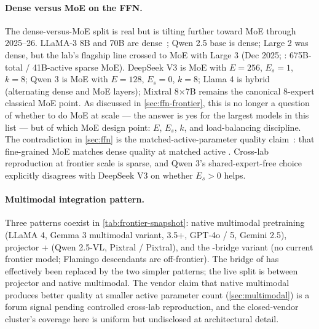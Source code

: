 \paragraph{Dense versus MoE on the FFN.}
The dense-versus-MoE split is real but is tilting further toward MoE
through 2025--26. LLaMA-3 8B and 70B are dense~\citep{meta-llama3};
Qwen 2.5 base is dense;  Large 2 was dense, but the lab's
flagship line crossed to MoE with  Large 3 (Dec 2025;
\citealp{mistral-large3-2025}: 675B-total / 41B-active sparse MoE).
DeepSeek V3 is MoE with $E = 256$, $E_s = 1$, $k = 8$; Qwen 3 is MoE
with $E = 128$, $E_s = 0$, $k = 8$; Llama 4 is hybrid (alternating
dense and MoE layers); Mixtral 8$\times$7B remains the canonical
8-expert classical MoE point. As discussed in
\cref{sec:ffn-frontier}, this is no longer a question of whether
to do MoE at scale --- the answer is yes for the largest models in
this list --- but of which MoE design point: $E$, $E_s$, $k$, and
load-balancing discipline. The contradiction in
\cref{sec:ffn} is the matched-active-parameter quality
claim~\citep{deepseek-v3,deepseekmoe2024}: that fine-grained MoE
matches dense quality at matched active . Cross-lab
reproduction at frontier scale is sparse, and Qwen 3's
shared-expert-free choice~\citep{qwen3} explicitly disagrees with
DeepSeek V3 on whether $E_s > 0$ helps.

\paragraph{Multimodal integration pattern.}
Three patterns coexist in \cref{tab:frontier-snapshot}: native
multimodal pretraining (LLaMA 4, Gemma 3 multimodal variant,
 3.5+, GPT-4o / 5, Gemini 2.5), projector + 
(Qwen 2.5-VL, Pixtral /  Pixtral), and the
-bridge variant (no current frontier model; Flamingo
descendants are off-frontier). The  bridge of
\citet{alayrac2022-flamingo} has effectively been replaced by the
two simpler patterns; the live split is between projector and
native multimodal. The vendor claim that native multimodal produces
better quality at smaller active parameter count
(\cref{sec:multimodal}) is a forum signal pending controlled
cross-lab reproduction, and the closed-vendor cluster's coverage
here is uniform but undisclosed at architectural detail.

